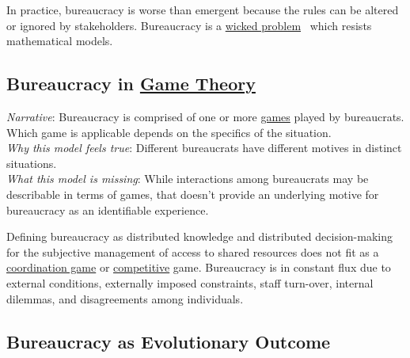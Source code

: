 In practice, bureaucracy is worse than emergent because the rules can be altered or ignored by  stakeholders. Bureaucracy is a \href{https://en.wikipedia.org/wiki/Wicked_problem}{wicked problem}~\cite{1973_Rittel} 
which resists mathematical models. 

\subsection*{Bureaucracy in \href{https://en.wikipedia.org/wiki/Game_theory}{Game Theory}}
\textit{Narrative}: Bureaucracy is comprised of one or more \href{https://en.wikipedia.org/wiki/List_of_games_in_game_theory}{games} 
played by bureaucrats. Which game is applicable depends on the specifics of the situation. \\
\textit{Why this model feels true}: Different bureaucrats have different motives in distinct situations. \\
\textit{What this model is missing}: While interactions among bureaucrats may be describable in terms of games, that doesn't provide an underlying motive for bureaucracy as an identifiable experience.  

Defining bureaucracy as distributed knowledge and distributed decision-making for the subjective management of access to shared resources does not fit as a \href{https://en.wikipedia.org/wiki/Coordination_game}{coordination game} 
or \href{https://en.wikipedia.org/wiki/Non-cooperative_game_theory}{competitive} game. 
Bureaucracy is in constant flux due to external conditions, externally imposed constraints, staff turn-over, internal dilemmas, and disagreements among individuals. 

\subsection*{Bureaucracy as Evolutionary Outcome}

